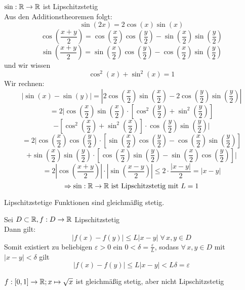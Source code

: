 \documentclass[../ana1u.tex]{subfiles}
\begin{document}
\begin{bsp}
    \(\sin: \mathbb{R} \rightarrow \mathbb{R} \) ist Lipschitzstetig \\
    Aus den Additionstheoremen folgt:
    \[\sin(2x) = 2 \cos(x)\sin(x) \]
    \[\cos\left(\frac{x+y}{2}\right) = \cos\left(\frac{x}{2}\right) \cos\left(\frac{y}{2}\right)
    - \sin\left(\frac{x}{2}\right) \sin\left(\frac{y}{2}\right)\]
    \[\sin\left(\frac{x+y}{2}\right) = \sin\left(\frac{x}{2}\right) \cos\left(\frac{y}{2}\right)
    - \cos\left(\frac{x}{2}\right) \sin\left(\frac{y}{2}\right)\]
    und wir wissen
    \[\cos^2(x) + \sin^2 (x) = 1 \]
    Wir rechnen:
    \[|\sin(x) - \sin(y)| = \left|2\cos\left(\frac{x}{2}\right)\sin\left(\frac{x}{2}\right)
    - 2\cos\left(\frac{y}{2}\right)\sin\left(\frac{y}{2}\right) \right| \]
    \[= 2 \bigg \vert \cos\left(\frac{x}{2}\right)\sin\left(\frac{x}{2}\right) \cdot
    \left[\cos^2\left(\frac{y}{2}\right) + \sin^2 \left(\frac{y}{2}\right)\right] \]
    \[- \left[\cos^2\left(\frac{x}{2}\right) + \sin^2 \left(\frac{x}{2}\right)\right]  
    \cdot \cos\left(\frac{y}{2}\right)\sin\left(\frac{y}{2}\right) \bigg \vert \]
    \[= 2 \bigg \vert \cos\left(\frac{x}{2}\right)\cos\left(\frac{y}{2}\right) \cdot 
    \left[\sin\left(\frac{x}{2}\right)\cos\left(\frac{y}{2}\right) - \cos \left(\frac{x}{2}\right)
    \sin\left(\frac{y}{2}\right)\right]\]
    \[+ \sin\left(\frac{x}{2}\right)\sin\left(\frac{y}{2}\right) \cdot \left[\cos\left(\frac{x}{2}\right)
    \sin\left(\frac{y}{2}\right) - \sin\left(\frac{x}{2}\right)\cos\left(\frac{y}{2}\right)\right] \bigg \vert \]
    \[= 2\left|\cos\left(\frac{x+y}{2}\right)\right| \cdot \left|\sin \left(\frac{x-y}{2}\right)\right| 
    \leq 2 \cdot \frac{|x-y|}{2} = |x-y| \]
    \[\Rightarrow \sin: \mathbb{R} \rightarrow \mathbb{R} \text{ ist Lipschitzstetig mit } L = 1 \]
\end{bsp}
\begin{beh}
    Lipschitzstetige Funktionen sind gleichmäßig stetig.
\end{beh}
\begin{bew}
    Sei \(D \subset \mathbb{R}, f: D \rightarrow \mathbb{R} \) Lipschitzstetig \\
    Dann gilt:
    \[|f(x)-f(y)| \leq L|x-y| \; \forall \, x,y \in D \]
    Somit existiert zu beliebigen \(\varepsilon > 0 \) ein \(0 < \delta = \frac{\varepsilon}{L} \),
    sodass \(\forall \, x,y \in D \) mit \(|x-y| < \delta \) gilt 
    \[|f(x) - f(y)| \leq L |x-y| < L \delta = \varepsilon \]
\end{bew}
\begin{beh}
    \(f:[0,1] \rightarrow \mathbb{R}; x \mapsto \sqrt{x} \) ist gleichmäßig stetig, aber nicht Lipschitzstetig
\end{beh}
\end{document}
